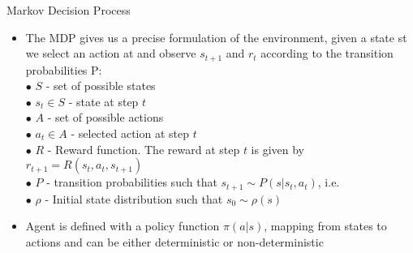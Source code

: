 \begin{frame}{Markov Decision Process}
    \begin{itemize}
        
        \item The MDP gives us a precise formulation of the environment, given a state st we select an action at and observe $s_{t+1}$ and $r_{t}$ according to the transition probabilities P:\\
        \bigskip
        \hspace{0.5cm}$\bullet$  $S$ - set of possible states \\
        \hspace{0.5cm}$\bullet$  $s_{t}\in S$ - state at step $t$ \\
        \hspace{0.5cm}$\bullet$  $A$ - set of possible actions \\
        \hspace{0.5cm}$\bullet$  $a_{t}\in A$ - selected action at step $t$\\
        \hspace{0.5cm}$\bullet$  $R$ - Reward function. The reward at step $t$ is given by $r_{t+1} = R(s_{t}, a_{t}, s_{t+1})$\\
        \hspace{0.5cm}$\bullet$ $P$ - transition probabilities such that $s_{t+1} ∼ P(s|s_{t},a_{t})$, i.e. \\
        \hspace{0.5cm}$\bullet$  $\rho$ - Initial state distribution such that $s_{0} ∼ \rho(s)$\\
        \bigskip
        \item Agent is defined with a policy function $\pi(a|s)$, mapping from states to actions and can be either deterministic or non-deterministic
        
    \end{itemize}
\end{frame}

